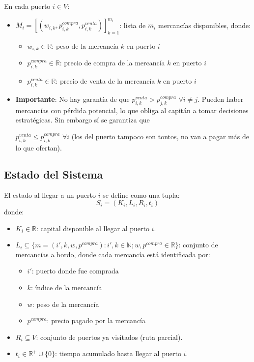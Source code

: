 \documentclass[12pt, a4paper]{article}
\begin{document}
En cada puerto $i \in V$:
\begin{itemize}
    \item $M_i = [(w_{i,k}, p_{i,k}^{compra}, p_{i,k}^{venta})]_{k=1}^{m_i}$: lista de $m_i$ mercancías disponibles, donde:
    \begin{itemize}
        \item $w_{i,k} \in \mathbb{R}$: peso de la mercancía $k$ en puerto $i$
        \item $p_{i,k}^{compra} \in \mathbb{R}$: precio de compra de la mercancía $k$ en puerto $i$
        \item $p_{i,k}^{venta} \in \mathbb{R}$: precio de venta de la mercancía $k$ en puerto $i$
    \end{itemize}
    \item \textbf{Importante}: No hay garantía de que $p_{i,k}^{venta} > p_{j,k}^{compra}$ $ \forall i \neq j$. Pueden haber mercancías con pérdida potencial, lo que obliga al capitán a tomar decisiones estratégicas. Sin embargo sí se garantiza que 
    
    $p_{i,k}^{venta} \leq p_{i,k}^{compra}$ $\forall i$ (los del puerto tampoco son tontos, no van a pagar más de lo que ofertan).
\end{itemize}

\subsection{Estado del Sistema}
El estado al llegar a un puerto $i$ se define como una tupla:
\[
S_i = (K_i, L_i, R_i, t_i)
\]
donde:
\begin{itemize}
    \item $K_i \in \mathbb{R}$: capital disponible al llegar al puerto $i$.
    \item $L_i \subseteq \{m = (i', k, w, p^{compra}): i', k \in \mathbb{N}; w, p^{compra} \in \mathbb{R}\}$: conjunto de mercancías a bordo, donde cada mercancía está identificada por:
    \begin{itemize}
        \item $i'$: puerto donde fue comprada
        \item $k$: índice de la mercancía
        \item $w$: peso de la mercancía
        \item $p^{compra}$: precio pagado por la mercancía
    \end{itemize}
    \item $R_i \subseteq V$: conjunto de puertos ya visitados (ruta parcial).
    \item $t_i \in \mathbb{R}^+ \cup \{0\}$: tiempo acumulado hasta llegar al puerto $i$.
\end{itemize}
\end{document}
